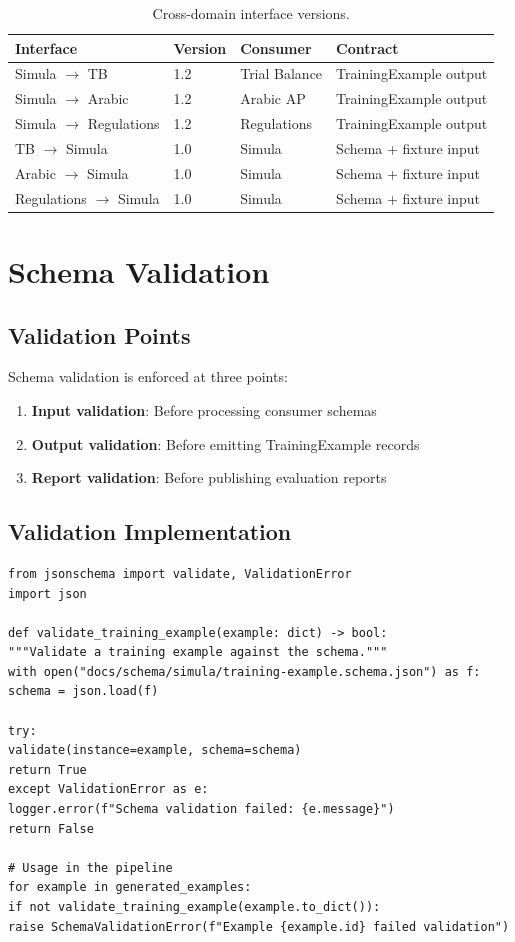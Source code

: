 \documentclass[12pt,a4paper,twoside]{report}
\begin{document}
\begin{table}[htbp]
\centering
\caption{Cross-domain interface versions.}
\label{tab:interface-versions}
\footnotesize
\begin{tabularx}{\textwidth}{@{}l l l X@{}}
\toprule
\textbf{Interface} & \textbf{Version} & \textbf{Consumer} & \textbf{Contract} \\
\midrule
Simula $\to$ TB & 1.2 & Trial Balance & TrainingExample output \\
Simula $\to$ Arabic & 1.2 & Arabic AP & TrainingExample output \\
Simula $\to$ Regulations & 1.2 & Regulations & TrainingExample output \\
TB $\to$ Simula & 1.0 & Simula & Schema + fixture input \\
Arabic $\to$ Simula & 1.0 & Simula & Schema + fixture input \\
Regulations $\to$ Simula & 1.0 & Simula & Schema + fixture input \\
\bottomrule
\end{tabularx}
\end{table}

\section{Schema Validation}

\subsection{Validation Points}

Schema validation is enforced at three points:

\begin{enumerate}
\item \textbf{Input validation}: Before processing consumer schemas
\item \textbf{Output validation}: Before emitting TrainingExample records
\item \textbf{Report validation}: Before publishing evaluation reports
\end{enumerate}

\subsection{Validation Implementation}

\begin{lstlisting}[language=jsonx,caption={Schema validation in the pipeline.}]
from jsonschema import validate, ValidationError
import json

def validate_training_example(example: dict) -> bool:
"""Validate a training example against the schema."""
with open("docs/schema/simula/training-example.schema.json") as f:
schema = json.load(f)

try:
validate(instance=example, schema=schema)
return True
except ValidationError as e:
logger.error(f"Schema validation failed: {e.message}")
return False

# Usage in the pipeline
for example in generated_examples:
if not validate_training_example(example.to_dict()):
raise SchemaValidationError(f"Example {example.id} failed validation")
\end{lstlisting}
\end{document}

